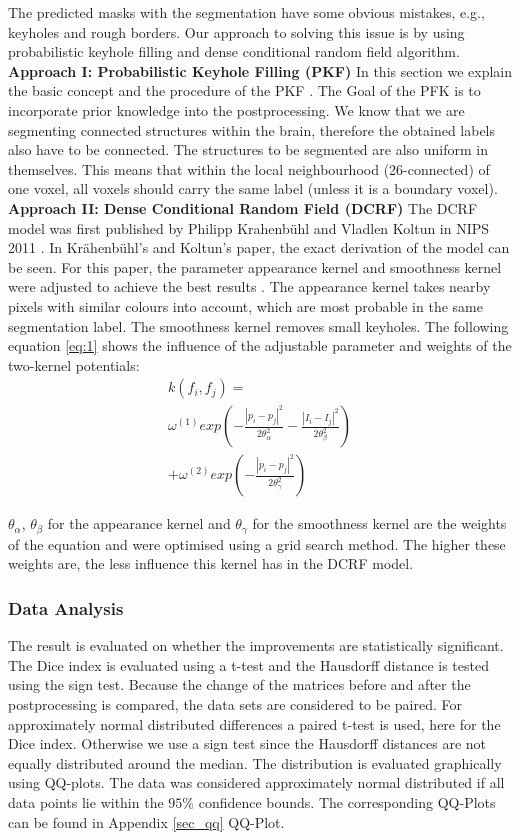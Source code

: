 \documentclass[journal]{IEEEtran}
\begin{document}
The predicted masks with the segmentation have some obvious mistakes, e.g., keyholes and rough borders. Our approach to solving this issue is by using probabilistic keyhole filling and dense conditional random field algorithm. 
\newline
\textbf{Approach I: Probabilistic Keyhole Filling (PKF)}
\newline
In this section we explain the basic concept and the procedure of the PKF . The Goal of the PFK is to incorporate prior knowledge into the postprocessing. We know that we are segmenting connected structures within the brain, therefore the obtained labels also have to be connected. The structures to be segmented are also uniform in themselves.
This means that within the local neighbourhood (26-connected) of one voxel, all voxels should carry the same label (unless it is a boundary voxel).
\newline
\textbf{Approach II: Dense Conditional Random Field (DCRF)}
\newline
The DCRF model was first published by Philipp Krahenbühl and Vladlen Koltun in NIPS 2011 \cite{Krahenbuhl2012}. In Krähenbühl’s and Koltun’s paper, the exact derivation of the model can be seen. For this paper, the parameter appearance kernel and smoothness kernel were adjusted to achieve the best results . The appearance kernel takes nearby pixels with similar colours into account, which are most probable in the same segmentation label. The smoothness kernel removes small keyholes. The following equation \ref{eq:1} shows the influence of the adjustable parameter and weights of the two-kernel potentials:
\begin{multline}\label{eq:1}
    k\left(f_i,f_j\right)=\\
\omega^{\left(1\right)}  exp\left(-\frac{\left| p_i - p_j\right|^2}{2\theta^2_\alpha}-\frac{\left| I_i-I_j\right|^2}{2\theta^2_\beta}\right)\\
+\omega^{\left(2\right)}exp\left(-\frac{\left|p_i-p_j\right|^2}{2\theta^2_\gamma}\right)
\end{multline}

$\theta_\alpha$, $\theta_\beta$ for the appearance kernel and $\theta_\gamma$ for the smoothness kernel are the weights of the equation and were optimised using a grid search method. The higher these weights are, the less influence this kernel has in the DCRF model.
\subsubsection{Data Analysis}
The result is evaluated on whether the improvements are statistically significant. The Dice index is evaluated using a t-test and the Hausdorff distance is tested using the sign test. 
Because the change of the matrices before and after the postprocessing is compared, the data sets are considered to be paired. For approximately normal distributed differences a paired t-test is used, here for the Dice index. Otherwise we use a sign test since the Hausdorff distances are not equally distributed around the median. The distribution is evaluated graphically using QQ-plots. The data was considered approximately normal distributed if all data points lie within the $95\%$ confidence bounds. The corresponding QQ-Plots can be found in Appendix \ref{sec_qq} QQ-Plot.
\onecolumn
\end{document}
